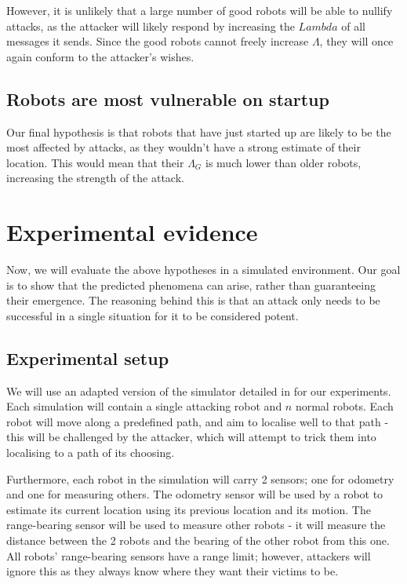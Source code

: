 However, it is unlikely that a large number of good robots will be able to nullify attacks, as the attacker will likely respond by increasing the $Lambda$ of all messages it sends. Since the good robots cannot freely increase $\Lambda$, they will once again conform to the attacker's wishes.

\subsection{Robots are most vulnerable on startup} \label{hyp:6}
Our final hypothesis is that robots that have just started up are likely to be the most affected by attacks, as they wouldn't have a strong estimate of their location. This would mean that their $\Lambda_G$ is much lower than older robots, increasing the strength of the attack.

\section{Experimental evidence}

Now, we will evaluate the above hypotheses in a simulated environment. Our goal is to show that the predicted phenomena can arise, rather than guaranteeing their emergence. The reasoning behind this is that an attack only needs to be successful in a single situation for it to be considered potent.

\subsection{Experimental setup}
We will use an adapted version of the simulator detailed in \cite[RobotWeb]{Robotweb} for our experiments. Each simulation will contain a single attacking robot and $n$ normal robots. Each robot will move along a predefined path, and aim to localise well to that path - this will be challenged by the attacker, which will attempt to trick them into localising to a path of its choosing.

Furthermore, each robot in the simulation will carry 2 sensors; one for odometry and one for measuring others. The odometry sensor will be used by a robot to estimate its current location using its previous location and its motion. The range-bearing sensor will be used to measure other robots - it will measure the distance between the 2 robots and the bearing of the other robot from this one. All robots' range-bearing sensors have a range limit; however, attackers will ignore this as they always know where they want their victims to be.

